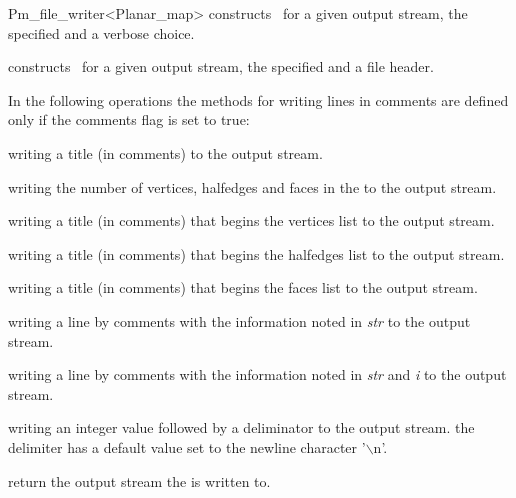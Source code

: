 \begin{ccRefClass}{Pm_file_writer<Planar_map>}
{constructs \ccRefName\ for a given output stream, the specified  and a verbose choice.}

{constructs \ccRefName\ for a given output stream, the specified  and a file header.}

\ccOperations

In the following operations the methods for writing lines in comments are defined only if the comments flag is set to true:

{writing a title (in comments) to the output stream.}

{writing the number of vertices, halfedges and faces in the  to the output stream.}

{writing a title (in comments) that begins the vertices list to the output stream.}

{writing a title (in comments) that begins the halfedges list to the output stream.}

{writing a title (in comments) that begins the faces list to the output stream.}

{writing a line by comments with the information noted in {\em str} to the output stream.}

{writing a line by comments with the information noted in {\em str} and {\em i} to the output stream.}

{writing an integer value followed by a deliminator to the output stream.
 the delimiter has a default value set to the newline character 
 '$\backslash$n'.}

{return the output stream the  is written to.} 



\end{ccRefClass}
